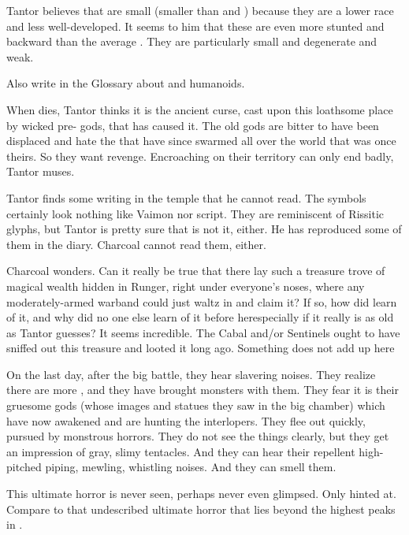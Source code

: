 \begin{changes}
    Tantor believes that \meccara are small (smaller than \humans and \scathae) because they are a lower race and less well-developed. 
    It seems to him that these \EreshKali are even more stunted and backward than the average \meccarans.
    They are particularly small and degenerate and weak. 
    
    Also write in the Glossary about  and  humanoids. 
    
    When \Mycah{} dies, Tantor thinks it is the ancient curse, cast upon this loathsome place by wicked pre-\human{} gods, that has caused it. 
    The old gods are bitter to have been displaced and hate the \humans{} that have since swarmed all over the world that was once theirs. 
    So they want revenge. 
    Encroaching on their territory can only end badly, Tantor muses. 
    
    Tantor finds some writing in the temple that he cannot read. 
    The symbols certainly look nothing like Vaimon nor \Ortaican{} script. 
    They are reminiscent of Rissitic glyphs, but Tantor is pretty sure that is not it, either. 
    He has reproduced some of them in the diary. 
    Charcoal cannot read them, either. 
    
    Charcoal wonders. 
    Can it really be true that there lay such a treasure trove of magical wealth hidden in Runger, right under everyone's noses, where any moderately-armed warband could just waltz in and claim it? 
    If so, how did \Takestsha{} learn of it, and why did no one else learn of it before her\dash especially if it really is as old as Tantor guesses? 
    It seems incredible. 
    The Cabal and/or Sentinels ought to have sniffed out this treasure and looted it long ago. 
    Something does not add up here\prikker 

    On the last day, after the big battle, they hear slavering noises.
    They realize there are more \meccara, and they have brought monsters with them. 
    They fear it is their gruesome gods (whose images and statues they saw in the big chamber) which have now awakened and are hunting the interlopers. 
    They flee out quickly, pursued by monstrous horrors. 
    They do not see the things clearly, but they get an impression of gray, slimy tentacles. 
    And they can hear their repellent high-pitched piping, mewling, whistling noises.
    And they can smell them.
    
    This ultimate horror is never seen, perhaps never even glimpsed. 
    Only hinted at.
    Compare to that undescribed ultimate horror that lies beyond the highest peaks in \cite{HPLovecraft:AttheMountainsofMadness}. 
    

\end{changes}
